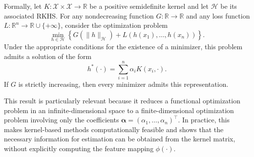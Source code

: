 Formally, let $K : \mathcal{X} \times \mathcal{X} \to \mathbb{R}$ be a
positive semidefinite kernel and let $\mathcal{H}$ be its associated RKHS.
For any nondecreasing function $G : \mathbb{R} \to \mathbb{R}$ and any loss
function $L : \mathbb{R}^n \to \mathbb{R} \cup \{+\infty\}$, consider the
optimization problem
\begin{equation}
\min_{h \in \mathcal{H}}
\left\{
G\left(\|h\|_{\mathcal{H}}\right)
+
L\left(h(x_1),\ldots,h(x_n)\right)
\right\}.
\end{equation}
Under the appropriate conditions for the existence of a minimizer, this
problem admits a solution of the form
\begin{equation}
h^{*}(\cdot)
=
\sum_{i=1}^{n}\alpha_i K(x_i,\cdot).
\end{equation}
If $G$ is strictly increasing, then every minimizer admits this
representation.

This result is particularly relevant because it reduces a functional
optimization problem in an infinite-dimensional space to a finite-dimensional
optimization problem involving only the coefficients
$\boldsymbol{\alpha}=(\alpha_1,\ldots,\alpha_n)^\top$. In practice, this
makes kernel-based methods computationally feasible and shows that the
necessary information for estimation can be obtained from the kernel matrix,
without explicitly computing the feature mapping $\phi(\cdot)$.

